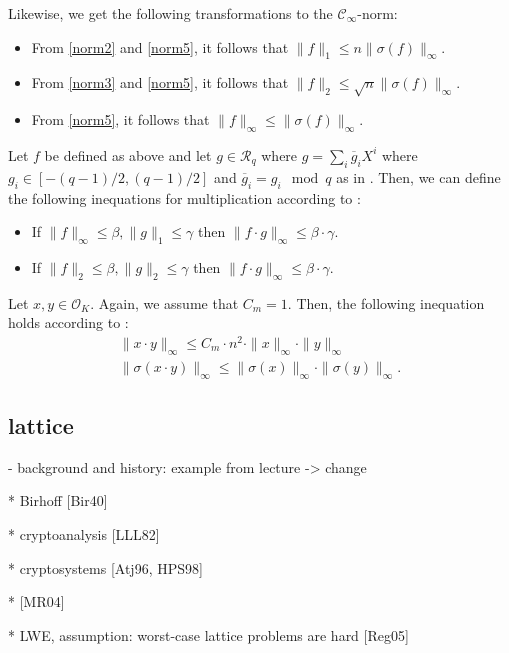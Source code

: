 \documentclass[
  a4paper,  %
  twoside,  %
  bibliography=totoc,
  headsepline,
  cleardoublepage=empty,
  parskip=half,
  draft=false
]{scrbook}
\begin{document}
Likewise, we get the following transformations to the $\mathcal{C}_\infty$-norm:
\begin{itemize}
  \item From \ref{norm2} and \ref{norm5}, it follows that $\| f \|_1 \leq  n \| \sigma(f) \|_\infty$.
  \item From \ref{norm3} and \ref{norm5}, it follows that $\| f \|_2 \leq  \sqrt{n} \| \sigma(f) \|_\infty$.
  \item From \ref{norm5}, it follows that $\| f \|_\infty \leq  \| \sigma(f) \|_\infty$.
\end{itemize}

Let $f$ be defined as above and let $g \in \mathcal{R}_q$ where $g = \sum_i \overline{g}_i X^i$ where $g_i \in \left[-(q-1)/2, (q-1)/2\right]$ and $\overline{g}_i = g_i \mod q$ as in \cite{BDLOP18}. Then, we can define the following inequations for multiplication according to \cite{BDLOP18}:

\begin{itemize}
  \item If $\|f\|_\infty \leq \beta, \|g\|_1 \leq \gamma$ then $\|f \cdot g\|_\infty \leq \beta \cdot \gamma$.
  \item If $\|f\|_2 \leq \beta, \|g\|_2 \leq \gamma$ then $\|f \cdot g\|_\infty \leq \beta \cdot \gamma$.
\end{itemize}

Let $x, y \in \mathcal{O}_K$. Again, we assume that $C_m = 1$. Then, the following inequation holds according to \cite{DPSZ12}:
\begin{align}
  \| x \cdot y \|_\infty \leq C_m \cdot n^2 \cdot \| x \|_\infty \cdot \| y \|_\infty\\
  \| \sigma(x \cdot y) \|_\infty \leq  \| \sigma(x) \|_\infty \cdot \| \sigma(y) \|_\infty.
\end{align}



\subsection{lattice}
- background and history: example from lecture -> change %

  * Birhoff [Bir40]

  * cryptoanalysis [LLL82]

  * cryptosystems [Atj96, HPS98]

  * [MR04]

  * LWE, assumption: worst-case lattice problems are hard [Reg05]
\end{document}
